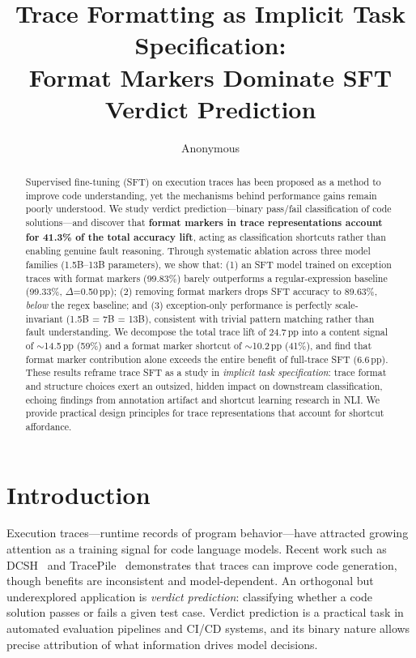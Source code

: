 \documentclass[11pt,a4paper]{article}
\title{Trace Formatting as Implicit Task Specification:\\Format Markers Dominate SFT Verdict Prediction}
\author{Anonymous}
\newcommand{\pp}{\,\text{pp}}
\begin{document}
\maketitle

\begin{abstract}
Supervised fine-tuning (SFT) on execution traces has been proposed as a method to improve code understanding, yet the mechanisms behind performance gains remain poorly understood.
We study verdict prediction---binary pass/fail classification of code solutions---and discover that \textbf{format markers in trace representations account for 41.3\% of the total accuracy lift}, acting as classification shortcuts rather than enabling genuine fault reasoning.
Through systematic ablation across three model families (1.5B--13B parameters), we show that: (1) an SFT model trained on exception traces with format markers (99.83\%) barely outperforms a regular-expression baseline (99.33\%, $\Delta$=0.50$\pp$); (2) removing format markers drops SFT accuracy to 89.63\%, \emph{below} the regex baseline; and (3) exception-only performance is perfectly scale-invariant (1.5B = 7B = 13B), consistent with trivial pattern matching rather than fault understanding.
We decompose the total trace lift of 24.7$\pp$ into a content signal of ${\sim}$14.5$\pp$ (59\%) and a format marker shortcut of ${\sim}$10.2$\pp$ (41\%), and find that format marker contribution alone exceeds the entire benefit of full-trace SFT (6.6$\pp$).
These results reframe trace SFT as a study in \emph{implicit task specification}: trace format and structure choices exert an outsized, hidden impact on downstream classification, echoing findings from annotation artifact and shortcut learning research in NLI.
We provide practical design principles for trace representations that account for shortcut affordance.
\end{abstract}

\section{Introduction}
\label{sec:intro}

Execution traces---runtime records of program behavior---have attracted growing attention as a training signal for code language models.
Recent work such as DCSH~\cite{gu2024execution} and TracePile~\cite{wang2025tracepile} demonstrates that traces can improve code generation, though benefits are inconsistent and model-dependent.
An orthogonal but underexplored application is \emph{verdict prediction}: classifying whether a code solution passes or fails a given test case.
Verdict prediction is a practical task in automated evaluation pipelines and CI/CD systems, and its binary nature allows precise attribution of what information drives model decisions.
\end{document}
